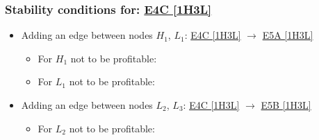 

\subsubsection{Stability conditions for: \hyperref[apx:E4C:1H3L]{E4C [1H3L]}}
\label{apx:E4C:1H3L_stability_cond}

\begin{itemize}

	\item Adding an edge between nodes $H_1$, $L_1$: \hyperref[apx:E4C:1H3L]{E4C [1H3L]} $\to$ \hyperref[apx:E5A:1H3L]{E5A [1H3L]}

	\begin{itemize}

		\item For $H_1$ not to be profitable:


		\item For $L_1$ not to be profitable:


	\end{itemize}

	\item Adding an edge between nodes $L_2$, $L_3$: \hyperref[apx:E4C:1H3L]{E4C [1H3L]} $\to$ \hyperref[apx:E5B:1H3L]{E5B [1H3L]}

	\begin{itemize}

		\item For $L_2$ not to be profitable:


\end{itemize}
\end{itemize}
